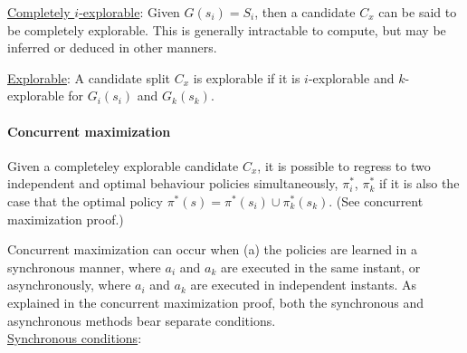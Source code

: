 \underline{Completely $i$-explorable}: Given $G( s_i ) = S_i$, then a candidate $C_x$ can be said to be completely explorable. This is generally intractable to compute, but may be inferred or deduced in other manners.

\underline{Explorable}: A candidate split $C_x$ is explorable if it is $i$-explorable and $k$-explorable for $G_i( s_i )$ and $G_k( s_k )$.

\paragraph{Concurrent maximization}

Given a completeley explorable candidate $C_x$, it is possible to regress to two independent and optimal behaviour policies simultaneously, $\pi^\ast_i$, $\pi^\ast_k$ if it is also the case that the optimal policy $\pi^\ast( s ) = \pi^\ast( s_i ) \cup \pi^\ast_k( s_k )$. (See concurrent maximization proof.)

Concurrent maximization can occur when (a) the policies are learned in a synchronous manner, where $a_i$ and $a_k$ are executed in the same instant, or asynchronously, where $a_i$ and $a_k$ are executed in independent instants. As explained in the concurrent maximization proof, both the synchronous and asynchronous methods bear separate conditions. \\

\underline{Synchronous conditions}:

